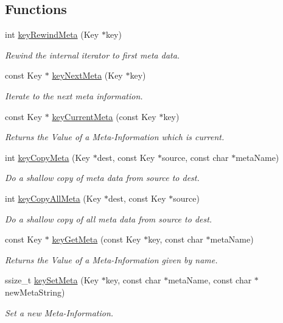 \subsection*{Functions}
\begin{DoxyCompactItemize}
\item 
int \hyperlink{group__keymeta_ga5dbb669802eea27e106ee3a5e39717a9}{key\+Rewind\+Meta} (Key $\ast$key)
\begin{DoxyCompactList}\small\item\em Rewind the internal iterator to first meta data. \end{DoxyCompactList}\item 
const Key $\ast$ \hyperlink{group__keymeta_ga4c88342f580a4291455a801af71ce048}{key\+Next\+Meta} (Key $\ast$key)
\begin{DoxyCompactList}\small\item\em Iterate to the next meta information. \end{DoxyCompactList}\item 
const Key $\ast$ \hyperlink{group__keymeta_ga74a273f529030f4947df52e14fdd2869}{key\+Current\+Meta} (const Key $\ast$key)
\begin{DoxyCompactList}\small\item\em Returns the Value of a Meta-\/\+Information which is current. \end{DoxyCompactList}\item 
int \hyperlink{group__keymeta_ga9a22b992478e613c8788bd460b4a1f0c}{key\+Copy\+Meta} (Key $\ast$dest, const Key $\ast$source, const char $\ast$meta\+Name)
\begin{DoxyCompactList}\small\item\em Do a shallow copy of meta data from source to dest. \end{DoxyCompactList}\item 
int \hyperlink{group__keymeta_ga8e63720a65610a29597494d0671f9401}{key\+Copy\+All\+Meta} (Key $\ast$dest, const Key $\ast$source)
\begin{DoxyCompactList}\small\item\em Do a shallow copy of all meta data from source to dest. \end{DoxyCompactList}\item 
const Key $\ast$ \hyperlink{group__keymeta_ga9ed3875495ddb3d8a8d29158a60a147c}{key\+Get\+Meta} (const Key $\ast$key, const char $\ast$meta\+Name)
\begin{DoxyCompactList}\small\item\em Returns the Value of a Meta-\/\+Information given by name. \end{DoxyCompactList}\item 
ssize\+\_\+t \hyperlink{group__keymeta_gae1f15546b234ffb6007d8a31178652b9}{key\+Set\+Meta} (Key $\ast$key, const char $\ast$meta\+Name, const char $\ast$new\+Meta\+String)
\begin{DoxyCompactList}\small\item\em Set a new Meta-\/\+Information. \end{DoxyCompactList}\end{DoxyCompactItemize}


